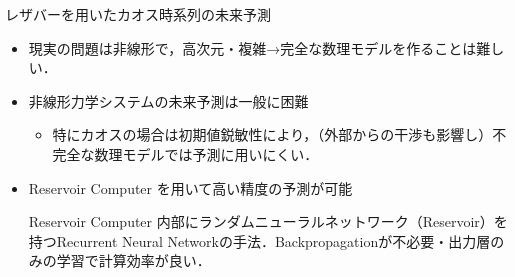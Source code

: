 \begin{frame}{レザバーを用いたカオス時系列の未来予測}
    
    \begin{itemize}
        \item 現実の問題は非線形で，高次元・複雑→完全な数理モデルを作ることは難しい．
        \item 非線形力学システムの未来予測は一般に困難
        \begin{itemize}
            \item 特にカオスの場合は初期値鋭敏性により，（外部からの干渉も影響し）不完全な数理モデルでは予測に用いにくい．
        \end{itemize}
        \item Reservoir Computer を用いて高い精度の予測が可能
        \begin{block}{Reservoir Computer}
            内部にランダムニューラルネットワーク（Reservoir）を持つRecurrent Neural Networkの手法．Backpropagationが不必要・出力層のみの学習で計算効率が良い． 
        \end{block}    
    \end{itemize}      
\end{frame}
